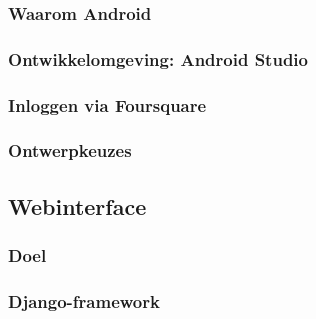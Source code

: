\subsubsection{Waarom Android}
% 
\subsubsection{Ontwikkelomgeving: Android Studio}
\subsubsection{Inloggen via Foursquare}

\subsubsection{Ontwerpkeuzes}

\subsection{Webinterface}
\subsubsection{Doel}
\subsubsection{Django-framework}
